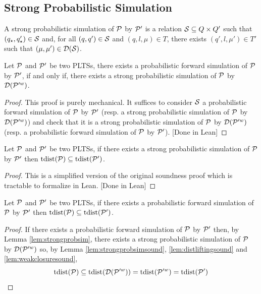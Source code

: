 \subsection{Strong Probabilistic Simulation}

\begin{definition}
    A strong probabilistic simulation of $\mathcal{P}$ by $\mathcal{P}'$ is a relation $\mathcal{S} \subseteq Q 
    \times Q'$ such that $(q_\star,q'_\star) \in \mathcal{S}$ and, for all $(q,q') \in \mathcal{S}$ and 
    $(q,l,\mu) \in T$, there exists $(q',l,\mu') \in T'$ such that $(\mu,\mu') \in \mathcal{D}(\mathcal{S})$.
\end{definition}

\begin{lemma}
    \label{lem:strongprobsim}
    Let $\mathcal{P}$ and $\mathcal{P}'$ be two PLTSs, there exists a probabilistic forward simulation of 
    $\mathcal{P}$ by $\mathcal{P}'$, if and only if, there exists a strong probabilistic simulation of $\mathcal{P}$
    by $\mathcal{D}(\mathcal{P}'^w)$.
\end{lemma}
\begin{proof}
    This proof is purely mechanical. It suffices to consider $\mathcal{S}$ a probabilistic forward 
    simulation of $\mathcal{P}$ by $\mathcal{P}'$ (resp. a strong probabilistic simulation of $\mathcal{P}$ by 
    $\mathcal{D}(\mathcal{P}'^w)$) and check that it is a strong probabilistic simulation of $\mathcal{P}$ by 
    $\mathcal{D}(\mathcal{P}'^w)$ (resp. a probabilistic forward 
    simulation of $\mathcal{P}$ by $\mathcal{P}'$). [Done in Lean]
\end{proof}

\begin{lemma}
    \label{lem:strongprobsimsound}
    Let $\mathcal{P}$ and $\mathcal{P}'$ be two PLTSs, if there exists a strong probabilistic simulation of 
    $\mathcal{P}$ by $\mathcal{P}'$ then $\text{tdist}(\mathcal{P}) \subseteq \text{tdist}(\mathcal{P}')$.
\end{lemma}
\begin{proof}
    This is a simplified version of the original soundness proof which is tractable to formalize in 
    Lean. [Done in Lean]
\end{proof}

\begin{theorem}
    Let $\mathcal{P}$ and $\mathcal{P}'$ be two PLTSs, if there exists a probabilistic forward simulation of 
    $\mathcal{P}$ by $\mathcal{P}'$ then $\text{tdist}(\mathcal{P}) \subseteq \text{tdist}(\mathcal{P}')$.
\end{theorem}
\begin{proof}
    If there exists a probabilistic forward simulation of $\mathcal{P}$ by $\mathcal{P}'$ then, by Lemma 
    \ref{lem:strongprobsim}, there exists a strong probabilistic simulation of $\mathcal{P}$ by 
    $\mathcal{D}(\mathcal{P}'^w)$ so, by Lemma \ref{lem:strongprobsimsound}, \ref{lem:distliftingsound} and \ref{lem:weakclosuresound},
    \begin{equation*}
        \text{tdist}(\mathcal{P}) \subseteq \text{tdist}(\mathcal{D}(\mathcal{P}'^w)) = \text{tdist}(\mathcal{P}'^w) = \text{tdist}(\mathcal{P}')
    \end{equation*}
\end{proof}
